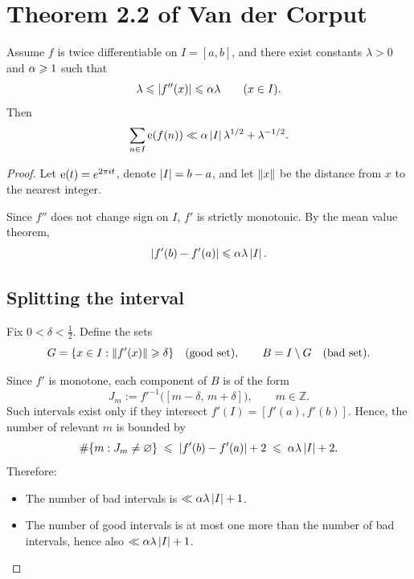\section{Theorem 2.2 of Van der Corput}

\begin{theorem}
Assume \(f\) is twice differentiable on \(I = [a,b]\), and there exist constants \(\lambda > 0\) and \(\alpha \geqslant 1\) such that
\[
   \lambda \leqslant \left\lvert f''(x) \right\rvert \leqslant \alpha \lambda \qquad (x \in I).
\]
Then
\[
   \sum_{n \in I} \operatorname{e} \! \left( f(n) \right) \ll \alpha \left\lvert I \right\rvert \lambda^{1/2} + \lambda^{-1/2}.
\]
\end{theorem}

\begin{proof}
Let \( \operatorname{e} \! \left( t \right) = e^{2\pi i t} \), denote \(\left\lvert I \right\rvert = b-a\), and let \(\left\lVert x \right\rVert\) be the distance from \(x\) to the nearest integer.  

Since \(f''\) does not change sign on \(I\), \(f'\) is strictly monotonic.  
By the mean value theorem,
\begin{equation}\label{eq:range-fprime}
   \left\lvert f'(b) - f'(a) \right\rvert \leqslant \alpha \lambda \left\lvert I \right\rvert.
\end{equation}

\subsection*{Splitting the interval}
Fix \(0 < \delta < \tfrac12\). Define the sets
\[
   G = \{ x \in I : \left\lVert f'(x) \right\rVert \geqslant \delta \} 
   \quad \text{(good set)}, \qquad 
   B = I \setminus G \quad \text{(bad set)}.
\]

Since \(f'\) is monotone, each component of \(B\) is of the form
\[
   J_m := f'^{-1}\big([m-\delta,\,m+\delta]\big), \qquad m \in \mathbb{Z}.
\]
Such intervals exist only if they intersect \(f'(I)=[f'(a),f'(b)]\). Hence, the number of relevant \(m\) is bounded by
\begin{equation}\label{eq:number-bad}
   \#\{m : J_m \neq \varnothing\} 
   \;\leqslant\; \left\lvert f'(b)-f'(a) \right\rvert + 2 
   \;\leqslant\; \alpha \lambda \left\lvert I \right\rvert + 2.
\end{equation}
Therefore:
\begin{itemize}[leftmargin=2em]
   \item The number of bad intervals is \(\ll \alpha \lambda \left\lvert I \right\rvert + 1\).
   \item The number of good intervals is at most one more than the number of bad intervals, hence also \(\ll \alpha \lambda \left\lvert I \right\rvert + 1\).
\end{itemize}


\end{proof}
